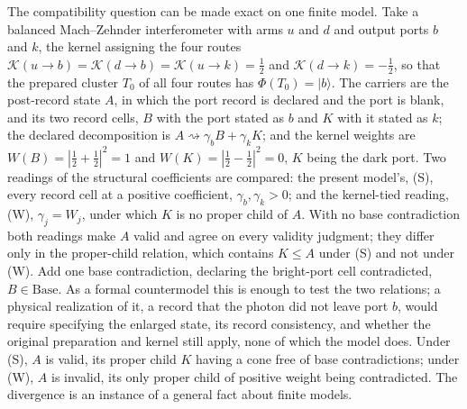 The compatibility question can be made exact on one finite model. Take a balanced Mach--Zehnder interferometer with arms $u$ and $d$ and output ports $b$ and $k$, the kernel assigning the four routes $\mathcal{K}(u \to b) = \mathcal{K}(d \to b) = \mathcal{K}(u \to k) = \tfrac12$ and $\mathcal{K}(d \to k) = -\tfrac12$, so that the prepared cluster $T_0$ of all four routes has $\Phi(T_0) = |b\rangle$. The carriers are the post-record state $A$, in which the port record is declared and the port is blank, and its two record cells, $B$ with the port stated as $b$ and $K$ with it stated as $k$; the declared decomposition is $A \rightsquigarrow \gamma_b B + \gamma_k K$; and the kernel weights are $W(B) = |\tfrac12 + \tfrac12|^2 = 1$ and $W(K) = |\tfrac12 - \tfrac12|^2 = 0$, $K$ being the dark port. Two readings of the structural coefficients are compared: the present model's, (S), every record cell at a positive coefficient, $\gamma_b, \gamma_k > 0$; and the kernel-tied reading, (W), $\gamma_j = W_j$, under which $K$ is no proper child of $A$. With no base contradiction both readings make $A$ valid and agree on every validity judgment; they differ only in the proper-child relation, which contains $K \le A$ under (S) and not under (W). Add one base contradiction, declaring the bright-port cell contradicted, $B \in \mathrm{Base}$. As a formal countermodel this is enough to test the two relations; a physical realization of it, a record that the photon did not leave port $b$, would require specifying the enlarged state, its record consistency, and whether the original preparation and kernel still apply, none of which the model does. Under (S), $A$ is valid, its proper child $K$ having a cone free of base contradictions; under (W), $A$ is invalid, its only proper child of positive weight being contradicted. The divergence is an instance of a general fact about finite models.

